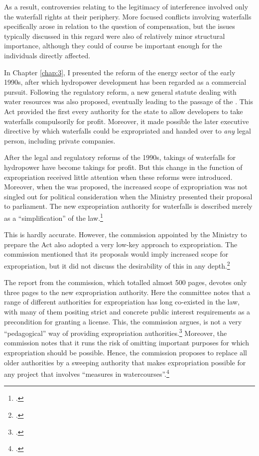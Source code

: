 As a result, controversies relating to the legitimacy of interference involved only the waterfall rights at their periphery. More focused conflicts involving waterfalls specifically arose in relation to the question of compensation, but the issues typically discussed in this regard were also of relatively minor structural importance, although they could of course be important enough for the individuals directly affected.

In Chapter \ref{chap:3}, I presented the reform of the energy sector of the early 1990s, after which hydropower development has been regarded as a commercial pursuit. Following the regulatory reform, a new general statute dealing with water resources was also proposed, eventually leading to the passage of the \cite{wra00}. This Act provided the first every authority for the state to allow developers to take waterfalls compulsorily for profit. Moreover, it made possible the later executive directive by which waterfalls could be expropriated and handed over to {\it any} legal person, including private companies.

After the legal and regulatory reforms of the 1990s, takings of waterfalls for hydropower have become takings for profit. But this change in the function of expropriation received little attention when these reforms were introduced. Moreover, when the \cite{wra00} was proposed, the increased scope of expropriation was not singled out for political consideration when the Ministry presented their proposal to parliament. The new expropriation authority for waterfalls is described merely as a ``simplification'' of the law.\footcite[223-225]{otprp39}

This is hardly accurate. However, the commission appointed by the Ministry to prepare the Act also adopted a very low-key approach to expropriation. The commission mentioned that its proposals would imply increased scope for expropriation, but it did not discuss the desirability of this in any depth.\footcite[235-237]{nou94} 

The report from the commission, which totalled almost 500 pages, devotes only three pages to the new expropriation authority. Here the committee notes that a range of different authorities for expropriation has long co-existed in the law, with many of them positing strict and concrete public interest requirements as a precondition for granting a license. This, the commission argues, is not a very ``pedagogical'' way of providing expropriation authorities.\footcite[235]{nou94} Moreover, the commission notes that it runs the risk of omitting important purposes for which expropriation should be possible. Hence, the commission proposes to replace all older authorities by a sweeping authority that makes expropriation possible for any project that involves ``measures in watercourses''.\footcite[235-236]{nou94}

